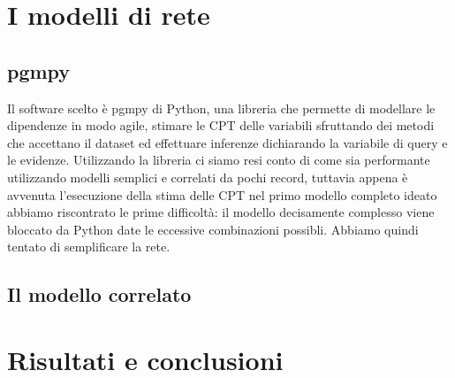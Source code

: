 \documentclass[12pt]{article}
\begin{document}
\section{I modelli di rete}
\subsection{pgmpy}
Il software scelto è pgmpy\cite{pgmpy} di Python, una libreria che permette di modellare le dipendenze in modo agile, stimare le CPT delle variabili sfruttando dei metodi che accettano il dataset ed effettuare inferenze dichiarando la variabile di query e le evidenze. \linebreak
Utilizzando la libreria ci siamo resi conto di come sia performante utilizzando modelli semplici e correlati da pochi record, tuttavia appena è avvenuta l'esecuzione della stima delle CPT nel primo modello completo ideato abbiamo riscontrato le prime difficoltà: il modello decisamente complesso viene bloccato da Python date le eccessive combinazioni possibli. Abbiamo quindi tentato di semplificare la rete.

\subsection{Il modello correlato}



\clearpage
\section{Risultati e conclusioni}

\newpage


\end{document}
